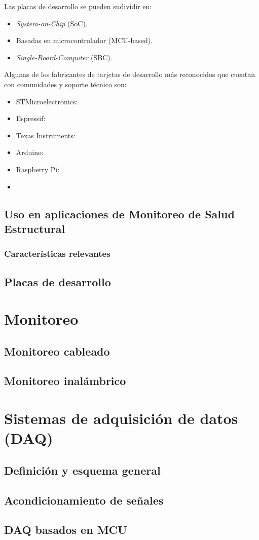 Las placas de desarrollo se pueden sudividir en:


\begin{itemize}
    \item \textit{System-on-Chip} (SoC).
    \item Basadas en microcontrolador (MCU-based).
    \item \textit{Single-Board-Computer} (SBC).
\end{itemize}
Algunas de los fabricantes de tarjetas de desarrollo más reconocidos que cuentan con comunidades y soporte técnico son:

\begin{itemize}
    \item STMicroelectronics: 
    \item Espressif:
    \item Texas Instruments:
    \item Arduino:
    \item Raspberry Pi:
    \item 
\end{itemize}

\subsection{Uso en aplicaciones de Monitoreo de Salud Estructural}



\subsubsection{Características relevantes}

\subsection{Placas de desarrollo}



\section{Monitoreo}

\subsection{Monitoreo cableado}

\subsection{Monitoreo inalámbrico}



\section{Sistemas de adquisición de datos (DAQ)}

\subsection{Definición y esquema general}

\subsection{Acondicionamiento de señales}

\subsection{DAQ basados en MCU}